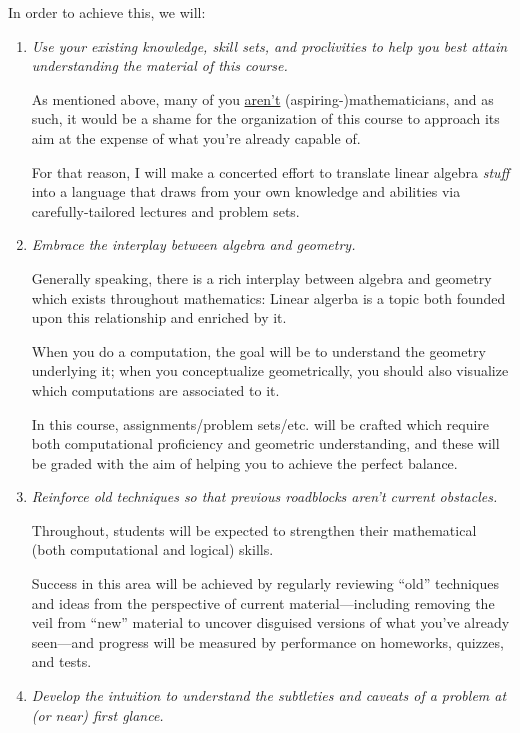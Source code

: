 \documentclass[12pt,oneside]{amsart}
\begin{document}
\noindent In order to achieve this, we will:\vspace{-1.5mm}
\begin{enumerate}[label=(Obj \arabic*),leftmargin=0.75in,rightmargin=0.25in,itemsep=1.5mm]
	\item \textit{Use your existing knowledge, skill sets, and proclivities to help you best attain understanding the material of this course.}
	
	As mentioned above, many of you \ul{aren't} (aspiring-)mathematicians, and as such, it would be a shame for the organization of this course to approach its aim at the expense of what you're already capable of. 
	
	For that reason, I will make a concerted effort to translate linear algebra \textit{stuff} into a language that draws from your own knowledge and abilities via carefully-tailored lectures and problem sets.
	
	\item \textit{Embrace the interplay between algebra and geometry.}
	
	Generally speaking, there is a rich interplay between algebra and geometry which exists throughout mathematics: Linear algerba is a topic both founded upon this relationship and enriched by it. 
	
	When you do a computation, the goal will be to understand the geometry underlying it; when you conceptualize geometrically, you should also visualize which computations are associated to it.
	
	In this course, assignments/problem sets/etc. will be crafted which require both computational proficiency and geometric understanding, and these will be graded with the aim of helping you to achieve the perfect balance.
	 
	\item \textit{Reinforce old techniques so that previous roadblocks aren't current obstacles.}
	
	Throughout, students will be expected to strengthen their mathematical (both computational and logical) skills.
	
	Success in this area will be achieved by regularly reviewing ``old'' techniques and ideas from the perspective of current material---including removing the veil from ``new'' material to uncover disguised versions of what you've already seen---and progress will be measured by performance on homeworks, quizzes, and tests. 

	\item \textit{Develop the intuition to understand the subtleties and caveats of a problem at (or near) first glance.} 
	

\end{enumerate}
\end{document}
